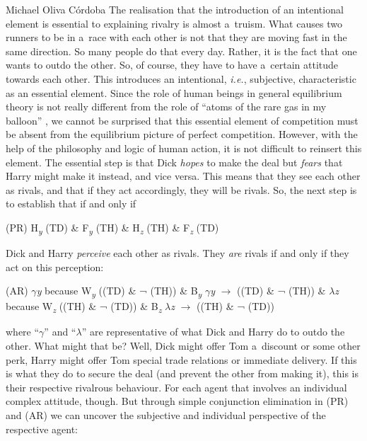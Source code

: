 \begin{artengenv}{Michael Oliva Córdoba}
The realisation that the introduction of an intentional element is essential to explaining rivalry is almost a~truism. What causes two runners to be in a~race with each other is not that they are moving fast in the same direction. So many people do that every day. Rather, it is the fact that one wants to outdo the other. So, of course, they have to have a~certain attitude towards each other. This introduces an intentional, \textit{i.e.}, subjective, characteristic as an essential element. Since the role of human beings in general equilibrium theory is not really different from the role of ``atoms of the rare gas in my balloon'' 
\parencite[][p.1411]{samuelson_modern_1966}, %
 we cannot be surprised that this essential element of competition must be absent from the equilibrium picture of perfect competition. However, with the help of the philosophy and logic of human action, it is not difficult to reinsert this element. The essential step is that Dick \textit{hopes} to make the deal but \textit{fears} that Harry might make it instead, and vice versa. This means that they see each other as rivals, and that if they act accordingly, they will be rivals. So, the next step is to establish that if and only if



\medskip

\noindent (PR) H\textit{\textsubscript{y}} (TD) \& F\textit{\textsubscript{y}} (TH) \& H\textit{\textsubscript{z}} (TH) \& F\textit{\textsubscript{z}} (TD)



\medskip

\noindent Dick and Harry \textit{perceive} each other as rivals. They \textit{are} rivals if and only if they act on this perception:



\medskip

\noindent (AR) \textit{$\gamma $y} because W\textit{\textsubscript{y}} ((TD) \& ¬ (TH)) \& B\textit{\textsubscript{y}} \textit{$\gamma $y} $\to$ ((TD) \& ¬ (TH))
\&
\textit{$\lambda $z} because W\textit{\textsubscript{z}} ((TH) \& ¬ (TD)) \& B\textit{\textsubscript{z}} \textit{$\lambda $z} $\to$ ((TH) \& ¬ (TD))

\medskip

\noindent where ``\textit{$\gamma $}'' and ``\textit{$\lambda $}'' are representative of what Dick and Harry do to outdo the other. What might that be? Well, Dick might offer Tom a~discount or some other perk, Harry might offer Tom special trade relations or immediate delivery. If this is what they do to secure the deal (and prevent the other from making it), this is their respective rivalrous behaviour. For each agent that involves an individual complex attitude, though. But through simple conjunction elimination in (PR) and (AR) we can uncover the subjective and individual perspective of the respective agent:




\end{artengenv}

